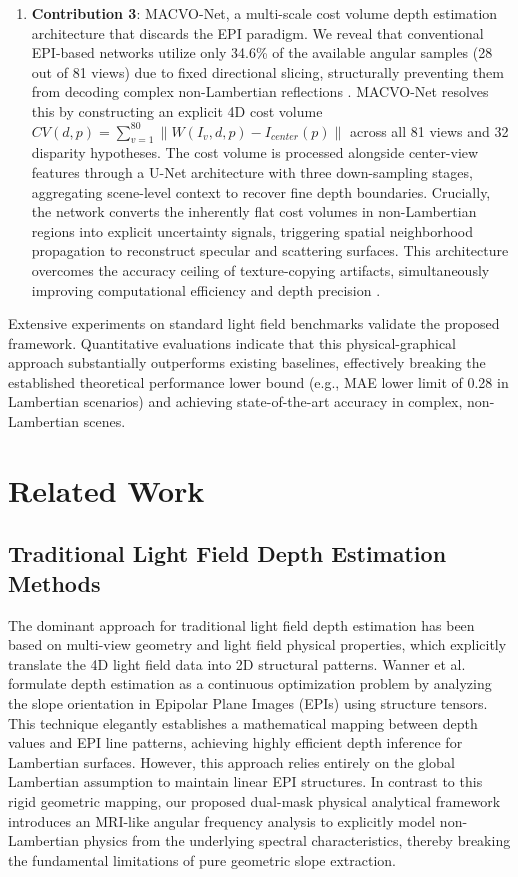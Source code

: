 \documentclass[lettersize,journal]{IEEEtran}
\begin{document}
\begin{enumerate}
    \item \textbf{Contribution 3}: MACVO-Net, a multi-scale cost volume depth estimation architecture that discards the EPI paradigm. We reveal that conventional EPI-based networks utilize only 34.6\% of the available angular samples (28 out of 81 views) due to fixed directional slicing, structurally preventing them from decoding complex non-Lambertian reflections \cite{wanner2014, heber2018}. MACVO-Net resolves this by constructing an explicit 4D cost volume $CV(d, p) = \sum_{v=1}^{80} \| W(I_v, d, p) - I_{center}(p) \|$ across all 81 views and 32 disparity hypotheses. The cost volume is processed alongside center-view features through a U-Net architecture \cite{ronneberger2015} with three down-sampling stages, aggregating scene-level context to recover fine depth boundaries. Crucially, the network converts the inherently flat cost volumes in non-Lambertian regions into explicit uncertainty signals, triggering spatial neighborhood propagation to reconstruct specular and scattering surfaces. This architecture overcomes the accuracy ceiling of texture-copying artifacts, simultaneously improving computational efficiency and depth precision \cite{lyu2022}.
\end{enumerate}

Extensive experiments on standard light field benchmarks validate the proposed framework. Quantitative evaluations indicate that this physical-graphical approach substantially outperforms existing baselines, effectively breaking the established theoretical performance lower bound (e.g., MAE lower limit of 0.28 in Lambertian scenarios) and achieving state-of-the-art accuracy in complex, non-Lambertian scenes.

\section{Related Work}

\subsection{Traditional Light Field Depth Estimation Methods}

The dominant approach for traditional light field depth estimation has been based on multi-view geometry and light field physical properties, which explicitly translate the 4D light field data into 2D structural patterns. Wanner et al. \cite{wanner2014} formulate depth estimation as a continuous optimization problem by analyzing the slope orientation in Epipolar Plane Images (EPIs) using structure tensors. This technique elegantly establishes a mathematical mapping between depth values and EPI line patterns, achieving highly efficient depth inference for Lambertian surfaces. However, this approach relies entirely on the global Lambertian assumption to maintain linear EPI structures. In contrast to this rigid geometric mapping, our proposed dual-mask physical analytical framework introduces an MRI-like angular frequency analysis to explicitly model non-Lambertian physics from the underlying spectral characteristics, thereby breaking the fundamental limitations of pure geometric slope extraction.
\end{document}
